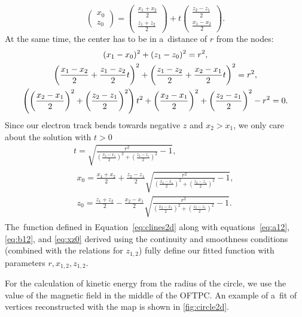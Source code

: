 				\begin{equation}
					\begin{pmatrix} x_0\\ z_0 \end{pmatrix} = \begin{pmatrix} \frac{x_1+x_2}{2}\\ \frac{z_1+z_2}{2} \end{pmatrix} + t \begin{pmatrix} \frac{z_2-z_1}{2}\\ \frac{x_1-x_2}{2} \end{pmatrix}.
				\end{equation}
			At the same time, the center has to be in a~distance of $r$ from the nodes:
				\begin{gather}
					(x_1-x_0)^2 + (z_1-z_0)^2 = r^2,\notag\\
					\left(\frac{x_1-x_2}{2}+\frac{z_1-z_2}{2}t\right)^2 + \left(\frac{z_1-z_2}{2}+\frac{x_2-x_1}{2}t\right)^2 = r^2,\notag\\
					\left(\left(\frac{x_2-x_1}{2}\right)^2+\left(\frac{z_2-z_1}{2}\right)^2\right)t^2+\left(\frac{x_2-x_1}{2}\right)^2+\left(\frac{z_2-z_1}{2}\right)^2-r^2=0.
				\end{gather}
			Since our electron track bends towards negative $z$ and $x_2 > x_1$, we only care about the solution with $t>0$
				\begin{gather}
					t = \sqrt{\frac{r^2}{\left(\frac{x_2-x_1}{2}\right)^2+\left(\frac{z_2-z_1}{2}\right)^2}-1},\\
					\begin{aligned}
						x_0 = \frac{x_1+x_2}{2} + \frac{z_2-z_1}{2} \sqrt{\frac{r^2}{\left(\frac{x_2-x_1}{2}\right)^2+\left(\frac{z_2-z_1}{2}\right)^2}-1},\label{eq:xz0}\\
						z_0 = \frac{z_1+z_2}{2} - \frac{x_2-x_1}{2} \sqrt{\frac{r^2}{\left(\frac{x_2-x_1}{2}\right)^2+\left(\frac{z_2-z_1}{2}\right)^2}-1}.
					\end{aligned}
				\end{gather}
			The~function defined in Equation~\ref{eq:clines2d} along with equations~\ref{eq:a12}, \ref{eq:b12}, and \ref{eq:xz0} derived using the continuity and smoothness conditions (combined with the relations for $z_{1,2}$) fully define our fitted function with parameters $r,x_{1,2},z_{1,2}$.
			
			For the calculation of kinetic energy from the radius of the circle, we use the value of the magnetic field in the middle of the \ac{OFTPC}. An example of a~fit of vertices reconstructed with the map is shown in \cref{fig:circle2d}.
			
